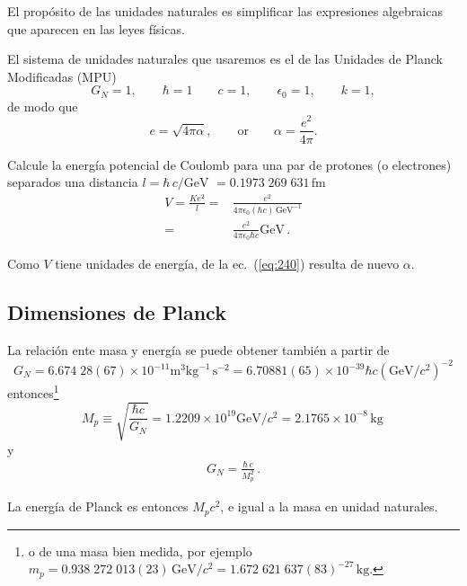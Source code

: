 \begin{frame}
El propósito de las unidades naturales es simplificar las expresiones algebraicas que aparecen en las leyes físicas. 

El sistema de unidades naturales que usaremos es el de las Unidades de Planck Modificadas (MPU)
\begin{equation}
  G_N=1,\qquad \hbar=1 \qquad c=1,\qquad \epsilon_0=1,\qquad k=1,
\end{equation}
de modo que
\begin{equation}
  e=\sqrt{4\pi\alpha},\qquad\text{or}\qquad \alpha=\frac{e^2}{4\pi}.
\end{equation}
  

\begin{example}
  Calcule la energía potencial de Coulomb para una par de protones (o electrones) separados una distancia $l=\hbar\,c/\text{GeV}$ $=0.1973\;269\;631\,\text{fm}$
  \begin{align}
    \label{eq:240}
    V=\frac{K e^2}{l}=&\frac{e^2}{4\pi\epsilon_0(\hbar c)\,\text{GeV}^{-1}}\nonumber\\
    =&\frac{e^2}{4\pi\epsilon_0\hbar c}\text{GeV}\,.
  \end{align}
\end{example}
Como $V$ tiene unidades de energía, de la ec.~(\ref{eq:240}) resulta de nuevo $\alpha$.
\end{frame}
\subsection{Dimensiones de Planck}


La relación ente masa y energía se puede obtener también a partir de 
\begin{equation}
  G_N=6.674\;28(67)\times10^{-11}\text{m}^3\text{kg}^{-1}\,\text{s}^{-2}=6.70881(65)\times10^{-39}\hbar c(\text{GeV}/c^2)^{-2}
\end{equation}
entonces\footnote{o de una masa bien medida, por ejemplo
  $m_p=0.938\;272\;013(23)\,\text{GeV}/c^2=1.672\;621\;637(83)^{-27}\,\text{kg}.$
}
\begin{equation}
  M_p\equiv\sqrt{\frac{\hbar c}{G_N}}=1.2209\times10^{19}\text{GeV}/c^2=2.1765\times10^{-8}\,\text{kg}\,
\end{equation}
y
\begin{align}
  \label{eq:242}
  G_N=\frac{\hbar\,c}{M_p^2}\,.
\end{align}

La energía de Planck es entonces $M_p c^2$, e igual a la masa en unidad naturales.


